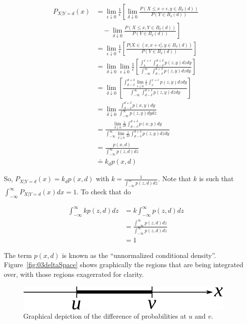 \begin{align*}
P_{X|Y=d}(x) &= \lim_{\epsilon\downarrow 0}\frac{1}{\epsilon}\left[\lim_{\delta\downarrow 0} \frac{P(X\leq x+\epsilon, y\in B_\delta(d))}{P(Y\in B_\delta(d))} \right. \\
&\left.\quad - \lim_{\delta\downarrow 0} \frac{P(X\leq x, Y\in B_\delta(d))}{P(Y\in B_\delta(d))}\right] \\
&= \lim_{\epsilon\downarrow 0}\frac{1}{\epsilon}\left[ \frac{P(X\in(x,x+\epsilon],y\in B_\delta(d))}{P(Y\in B_\delta(d))}\right] \\%
&= \lim_{\delta\downarrow 0}\lim_{\epsilon\downarrow 0}\frac{1}{\epsilon} \left[ \frac{\int_x^{x+\epsilon} \int_{d-\delta}^{d+\delta} p(z,y)dzdy}{\int_{-\infty}^\infty \int_{d-\delta}^{d+\delta} p(z,y)dzdy}\right] \\
&= \lim_{\delta\downarrow 0}\left[ \frac{\int_{d-\delta}^{d+\delta}\lim_{\epsilon\downarrow 0} \frac{1}{\epsilon} \int_x^{x+\epsilon} p(z,y)dzdy}{\int_{-\infty}^\infty \int_{d-\delta}^{d+\delta} p(z,y)dzdy}\right] \\
&= \lim_{\delta\downarrow 0} \frac{\int_{d-\delta}^{d+\delta}p(x,y)dy}{\int_{-\infty}^\infty p(z,y)dydz} \\
&= \frac{\lim_{\delta\downarrow 0}\frac{1}{2\delta}\int_{d-\delta}^{d+\delta} p(x,y)dy}{\int_{-\infty}^\infty \lim_{\delta\downarrow 0}\frac{1}{2\delta}\int_{d-\delta}^{d+\delta} p(z,y)dzdy} \\
&= \frac{p(x,d)}{\int_{-\infty}^\infty p(z,d)dz} \\
&\doteq k_d p(x,d)
\end{align*}

So, $P_{X|Y=d}(x) = k_d p(x,d)$ with $k=\frac{1}{\int_{-\infty}^\infty p(z,d)dz}$.
Note that $k$ is such that $\int_{-\infty}^\infty P_{X|Y=d}(x)dx=1$.
To check that do

\begin{align*}
\int_{-\infty}^\infty kp(z,d)dz &= k\int_{-\infty}^\infty p(z,d)dz \\
&= \frac{\int_{-\infty}^\infty p(z,d)dz}{\int_{-\infty}^\infty p(z,d)dz} \\
&= 1
\end{align*}

The term $p(x,d)$ is known as the ``unnormalized conditional density''.
Figure~\ref{fig:03deltaSpace} shows graphically the regions that are being integrated over, with those regions exagerrated for clarity.

\begin{figure}[ht!]
\centering
\includegraphics[width=.5\textwidth]{images/03probR1}
\caption{Graphical depiction of the difference of probabilities at $u$ and $v$.}
\label{fig:03probR1}
\end{figure}

